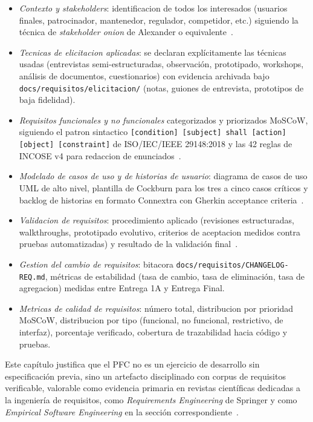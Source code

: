\documentclass[11pt,a4paper]{article}
\begin{document}
\begin{itemize}
    \item \emph{Contexto y stakeholders}: identificacion de todos los interesados (usuarios finales, patrocinador, mantenedor, regulador, competidor, etc.) siguiendo la t\'{e}cnica de \emph{stakeholder onion} de Alexander o equivalente~\cite{robertson2012mastering,wiegers2013software}.
    \item \emph{Tecnicas de elicitacion aplicadas}: se declaran expl\'{i}citamente las t\'{e}cnicas usadas (entrevistas semi-estructuradas, observaci\'{o}n, prototipado, workshops, an\'{a}lisis de documentos, cuestionarios) con evidencia archivada bajo \texttt{docs/requisitos/elicitacion/} (notas, guiones de entrevista, prototipos de baja fidelidad).
    \item \emph{Requisitos funcionales y no funcionales} categorizados y priorizados MoSCoW, siguiendo el patron sintactico \texttt{[condition] [subject] shall [action] [object] [constraint]} de ISO/IEC/IEEE 29148:2018 y las 42 reglas de INCOSE v4 para redaccion de enunciados~\cite{iso29148,incose2023requirements}.
    \item \emph{Modelado de casos de uso y de historias de usuario}: diagrama de casos de uso UML de alto nivel, plantilla de Cockburn para los tres a cinco casos cr\'{i}ticos y backlog de historias en formato Connextra con Gherkin acceptance criteria~\cite{cockburn2001writing,cohn2004user}.
    \item \emph{Validacion de requisitos}: procedimiento aplicado (revisiones estructuradas, walkthroughs, prototipado evolutivo, criterios de aceptacion medidos contra pruebas automatizadas) y resultado de la validaci\'{o}n final~\cite{pohl2010requirements,wiegers2013software}.
    \item \emph{Gestion del cambio de requisitos}: bitacora \texttt{docs/requisitos/CHANGELOG-REQ.md}, m\'{e}tricas de estabilidad (tasa de cambio, tasa de eliminaci\'{o}n, tasa de agregacion) medidas entre Entrega 1A y Entrega Final.
    \item \emph{Metricas de calidad de requisitos}: n\'{u}mero total, distribucion por prioridad MoSCoW, distribucion por tipo (funcional, no funcional, restrictivo, de interfaz), porcentaje verificado, cobertura de trazabilidad hacia c\'{o}digo y pruebas.
\end{itemize}

Este cap\'{i}tulo justifica que el PFC no es un ejercicio de desarrollo sin especificaci\'{o}n previa, sino un artefacto disciplinado con corpus de requisitos verificable, valorable como evidencia primaria en revistas cient\'{i}ficas dedicadas a la ingenier\'{i}a de requisitos, como \emph{Requirements Engineering} de Springer y como \emph{Empirical Software Engineering} en la secci\'{o}n correspondiente~\cite{iso29148,ralph2021empirical}.
\end{document}
